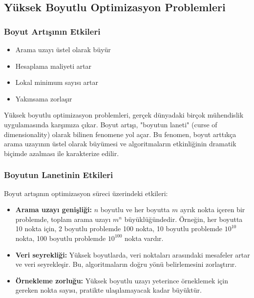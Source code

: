 \subsection{Yüksek Boyutlu Optimizasyon Problemleri}

\subsubsection{Boyut Artışının Etkileri}
\begin{itemize}
    \item Arama uzayı üstel olarak büyür
    \item Hesaplama maliyeti artar
    \item Lokal minimum sayısı artar
    \item Yakınsama zorlaşır
\end{itemize}

Yüksek boyutlu optimizasyon problemleri, gerçek dünyadaki birçok mühendislik uygulamasında karşımıza çıkar. Boyut artışı, "boyutun laneti" (curse of dimensionality) olarak bilinen fenomene yol açar. Bu fenomen, boyut arttıkça arama uzayının üstel olarak büyümesi ve algoritmaların etkinliğinin dramatik biçimde azalması ile karakterize edilir.

\subsubsection{Boyutun Lanetinin Etkileri}

Boyut artışının optimizasyon süreci üzerindeki etkileri:

\begin{itemize}
    \item \textbf{Arama uzayı genişliği:} $n$ boyutlu ve her boyutta $m$ ayrık nokta içeren bir problemde, toplam arama uzayı $m^n$ büyüklüğündedir. Örneğin, her boyutta 10 nokta için, 2 boyutlu problemde 100 nokta, 10 boyutlu problemde $10^{10}$ nokta, 100 boyutlu problemde $10^{100}$ nokta vardır.
    
    \item \textbf{Veri seyrekliği:} Yüksek boyutlarda, veri noktaları arasındaki mesafeler artar ve veri seyrekleşir. Bu, algoritmaların doğru yönü belirlemesini zorlaştırır.
    
    \item \textbf{Örnekleme zorluğu:} Yüksek boyutlu uzayı yeterince örneklemek için gereken nokta sayısı, pratikte ulaşılamayacak kadar büyüktür.
\end{itemize}

